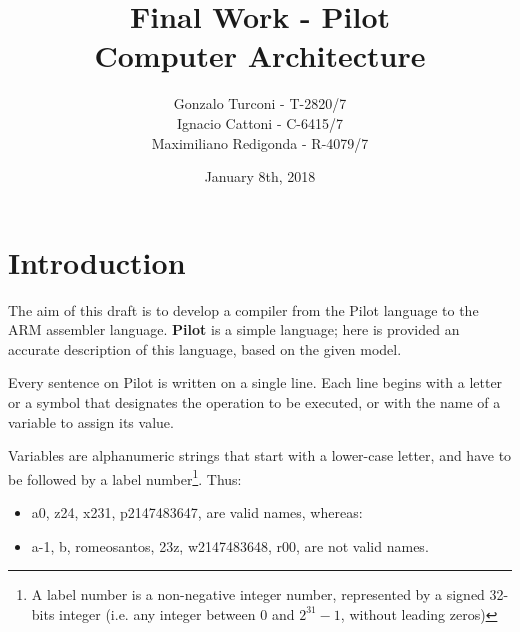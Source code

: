 \documentclass[12pt,spanish]{article}
\begin{document}
 
 
\title{Final Work - Pilot \\
 \large Computer Architecture
}
\date{January 8th, 2018}
\author{Gonzalo Turconi - T-2820/7 \\
        Ignacio Cattoni - C-6415/7 \\
        Maximiliano Redigonda - R-4079/7}
\maketitle

\section{Introduction}
The aim of this draft is to develop a compiler from the Pilot language to the ARM assembler language. \textbf{Pilot} is a simple language; here is provided an accurate description of this language, based on the given model.

Every sentence on Pilot is written on a single line. Each line begins with a letter or a symbol that designates the operation to be executed, or with the name of a variable to assign its value.

Variables are alphanumeric strings that start with a lower-case letter, and have to be followed by a label number\footnote{A label number is a non-negative integer number, represented by a signed 32-bits integer (i.e. any integer between $0$ and $2^{31}-1$, without leading zeros)}. Thus:
\begin{itemize}
\item{a0, z24, x231, p2147483647, are valid names, whereas:}
\item{a-1, b, romeosantos, 23z, w2147483648, r00, are not valid names.}
\end{itemize}
\end{document}
